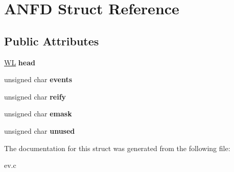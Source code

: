 \hypertarget{struct_a_n_f_d}{}\section{A\+N\+FD Struct Reference}
\label{struct_a_n_f_d}
\subsection*{Public Attributes}
\begin{DoxyCompactItemize}
\item 
\hypertarget{struct_a_n_f_d_a1fd948f270a9e89569e1909f8a5fffaf}{}\label{struct_a_n_f_d_a1fd948f270a9e89569e1909f8a5fffaf} 
\hyperlink{structev__watcher__list}{WL} {\bfseries head}
\item 
\hypertarget{struct_a_n_f_d_aefcc21fd2b58113bd697bf4832a9127d}{}\label{struct_a_n_f_d_aefcc21fd2b58113bd697bf4832a9127d} 
unsigned char {\bfseries events}
\item 
\hypertarget{struct_a_n_f_d_a0f80e417303b92e8826478bfa1225b09}{}\label{struct_a_n_f_d_a0f80e417303b92e8826478bfa1225b09} 
unsigned char {\bfseries reify}
\item 
\hypertarget{struct_a_n_f_d_a8136a4e793913def66f01dd6f6aedc6e}{}\label{struct_a_n_f_d_a8136a4e793913def66f01dd6f6aedc6e} 
unsigned char {\bfseries emask}
\item 
\hypertarget{struct_a_n_f_d_aa5610b4dca18f6fdfcf647cf83b53614}{}\label{struct_a_n_f_d_aa5610b4dca18f6fdfcf647cf83b53614} 
unsigned char {\bfseries unused}
\end{DoxyCompactItemize}


The documentation for this struct was generated from the following file\+:\begin{DoxyCompactItemize}
\item 
ev.\+c\end{DoxyCompactItemize}
